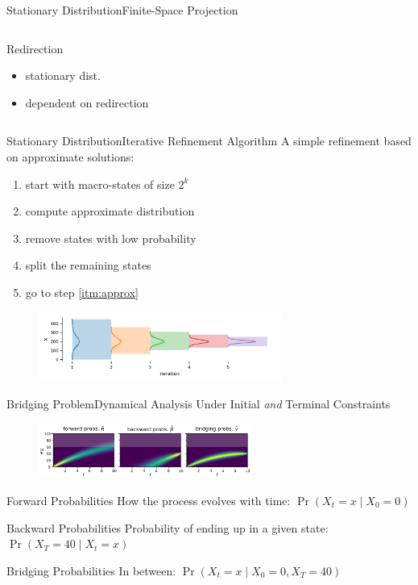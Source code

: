 \documentclass{beamer}
\begin{document}
\begin{frame}{Stationary Distribution}{Finite-Space Projection}
\begin{columns}
\begin{column}{.30\textwidth}
\begin{block}{Redirection}
                {\small
                \begin{itemize}
                    \item stationary dist.
                    \item dependent on redirection
                \end{itemize}
                }
            \end{block}
        \end{column}
    \end{columns}
\end{frame}

\begin{frame}{Stationary Distribution}{Iterative Refinement Algorithm}
    A simple refinement based on approximate solutions:
    \begin{enumerate}
        \item start with macro-states of size $2^k$
        \item\label{itm:approx} compute approximate distribution
        \item remove states with low probability
        \item split the remaining states
        \item go to step \ref{itm:approx}
    \end{enumerate}
    \begin{figure}
        \includegraphics[width=8cm]{../gfx/bd_truncs.pdf}
    \end{figure}
\end{frame}

\begin{frame}{Bridging Problem}{Dynamical Analysis Under Initial \emph{and} Terminal Constraints}
    \begin{figure}
        \includegraphics[width=7cm]{../gfx/bridging_bd.pdf}
    \end{figure}
    \begin{block}{Forward Probabilities}
        How the process evolves with time: $\Pr({X_t=x\mid X_0=0})$
    \end{block}
    \begin{block}{Backward Probabilities}
        Probability of ending up in a given state: $\Pr(X_T=40 \mid X_t = x)$
    \end{block}
    \begin{block}{Bridging Probabilities}
        In between: $\Pr (X_t=x\mid X_0=0, X_T=40)$
    \end{block}
\end{frame}
\end{document}
